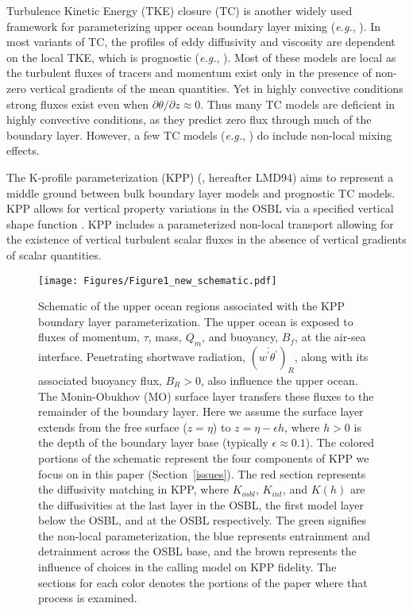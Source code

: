 \documentclass[preprint,12pt,authoryear]{agujournal}
\begin{document}
Turbulence Kinetic Energy (TKE) closure (TC) is another widely used framework for parameterizing upper ocean boundary layer mixing (\textit{e.g.}, \citealp{kantha1994improved,Canuto2001,Umlauf2005,canuto2007non,harcourt2015improved}). In most variants of TC, the profiles of eddy diffusivity and viscosity are dependent on the local TKE, which is prognostic (\textit{e.g.}, \citealp{Mellor1982,kantha1994improved}).  Most of these models are local as the turbulent fluxes of tracers and momentum exist only in the presence of non-zero vertical gradients of the mean quantities. Yet in highly convective conditions strong fluxes exist even when $\partial \theta / \partial z \approx 0$.  Thus many TC models are deficient in highly convective conditions, as they predict zero flux through much of the boundary layer. However, a few TC models (\textit{e.g.}, \citealp{stull1993review,lappen2001toward,soares2004eddy}) do include non-local mixing effects.

The K-profile parameterization (KPP) (\citealp{Large1994}, hereafter LMD94) aims to represent a middle ground between bulk boundary layer models and prognostic TC models.  KPP allows for vertical property variations in the OSBL via a specified vertical shape function \citep{OBrien1970}.  KPP includes a parameterized non-local transport allowing for the existence of vertical turbulent scalar fluxes in the absence of vertical gradients of scalar quantities.

\begin{figure}[thbp]
	\centering
    \texttt{[image: Figures/Figure1\_new\_schematic.pdf]}
\caption{Schematic of the upper ocean regions associated with the KPP boundary layer parameterization.  The upper ocean is exposed to fluxes of momentum, $\tau$, mass, $Q_m$, and buoyancy, $B_f$, at the air-sea interface.  Penetrating shortwave radiation, $(\overline{w^\prime \theta^\prime})_R$, along with its associated buoyancy flux, $B_{R}>0$, also influence the upper ocean.  The Monin-Obukhov (MO) surface layer transfers these fluxes to the remainder of the boundary layer.  Here we assume the surface layer extends from the free surface ($z = \eta$) to $z = \eta - \epsilon h$, where $h > 0$ is the depth of the boundary layer base (typically $\epsilon \approx 0.1$).  The colored portions of the schematic represent the four components of KPP we focus on in this paper (Section~\ref{issues}).  The red section represents the diffusivity matching in KPP, where $K_{osbl}$, $K_{int}$, and $K(h)$ are the diffusivities at the last layer in the OSBL, the first model layer below the OSBL, and at the OSBL respectively.  The green signifies the non-local parameterization, the blue represents entrainment and detrainment across the OSBL base, and the brown represents the influence of choices in the calling model on KPP fidelity.  The sections for each color denotes the portions of the paper where that process is examined.}
\label{BL_schematics}
\end{figure}
\end{document}
